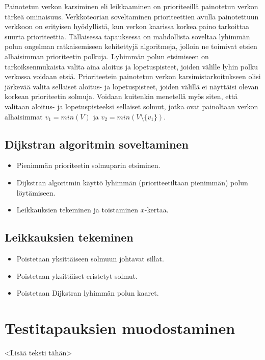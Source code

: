 Painotetun verkon karsiminen eli leikkaaminen on prioriteeillä painotetun verkon tärkeä ominaisuus.
Verkkoteorian soveltaminen prioriteettien avulla painotettuun verkkoon on erityisen hyödyllistä, kun verkon kaarissa korkea paino tarkoittaa suurta prioriteettia.
Tällaisessa tapauksessa on mahdollista soveltaa lyhimmän polun ongelman ratkaisemiseen kehitettyjä algoritmeja, jolloin ne toimivat etsien alhaisimman prioriteetin polkuja.
Lyhimmän polun etsimiseen on tarkoiksenmukaista valita aina aloitus ja lopetuspisteet, joiden välille lyhin polku verkossa voidaan etsiä.
Prioriteetein painotetun verkon karsimistarkoitukseen olisi järkevää valita sellaiset aloitus- ja lopetuspisteet, joiden välillä ei näyttäisi olevan korkean prioriteetin solmuja.
Voidaan kuitenkin menetellä myös siten, että valitaan aloitus- ja lopetuspisteeksi sellaiset solmut, jotka ovat painoltaan verkon alhaisimmat \(v_1 = min(V)\) ja \(v_2 = min(V \setminus \{v_1\})\).

  \subsection{Dijkstran algoritmin soveltaminen}

  \begin{itemize}
    \item Pienimmän prioriteetin solmuparin etsiminen.
    \item Dijkstran algoritmin käyttö lyhimmän (prioriteetiltaan pienimmän) polun löytämiseen.
    \item Leikkauksien tekeminen ja toistaminen \(x\)-kertaa.
  \end{itemize}

  \subsection{Leikkauksien tekeminen}

  \begin{itemize}
    \item Poistetaan yksittäiseen solmuun johtavat sillat.
    \item Poistetaan yksittäiset eristetyt solmut.
    \item Poistetaan Dijkstran lyhimmän polun kaaret.
  \end{itemize}

\section{Testitapauksien muodostaminen}

<Lisää teksti tähän>
